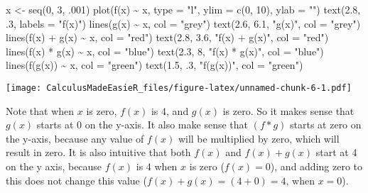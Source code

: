 \documentclass[
]{book}
\newenvironment{Shaded}{\begin{snugshade}}{\end{snugshade}}
\newcommand{\AttributeTok}[1]{\textcolor[rgb]{0.77,0.63,0.00}{#1}}
\newcommand{\DecValTok}[1]{\textcolor[rgb]{0.00,0.00,0.81}{#1}}
\newcommand{\FloatTok}[1]{\textcolor[rgb]{0.00,0.00,0.81}{#1}}
\newcommand{\FunctionTok}[1]{\textcolor[rgb]{0.00,0.00,0.00}{#1}}
\newcommand{\NormalTok}[1]{#1}
\newcommand{\OtherTok}[1]{\textcolor[rgb]{0.56,0.35,0.01}{#1}}
\newcommand{\SpecialCharTok}[1]{\textcolor[rgb]{0.00,0.00,0.00}{#1}}
\newcommand{\StringTok}[1]{\textcolor[rgb]{0.31,0.60,0.02}{#1}}
\begin{document}
\begin{Shaded}
\begin{Highlighting}[]
\NormalTok{x }\OtherTok{\textless{}{-}} \FunctionTok{seq}\NormalTok{(}\DecValTok{0}\NormalTok{, }\DecValTok{3}\NormalTok{, .}\DecValTok{001}\NormalTok{)}
\FunctionTok{plot}\NormalTok{(}\FunctionTok{f}\NormalTok{(x) }\SpecialCharTok{\textasciitilde{}}\NormalTok{ x, }\AttributeTok{type =} \StringTok{"l"}\NormalTok{, }\AttributeTok{ylim =} \FunctionTok{c}\NormalTok{(}\DecValTok{0}\NormalTok{, }\DecValTok{10}\NormalTok{), }\AttributeTok{ylab =} \StringTok{""}\NormalTok{)}
\FunctionTok{text}\NormalTok{(}\FloatTok{2.8}\NormalTok{, .}\DecValTok{3}\NormalTok{, }\AttributeTok{labels =} \StringTok{"f(x)"}\NormalTok{)}
\FunctionTok{lines}\NormalTok{(}\FunctionTok{g}\NormalTok{(x) }\SpecialCharTok{\textasciitilde{}}\NormalTok{ x, }\AttributeTok{col =} \StringTok{"grey"}\NormalTok{)}
\FunctionTok{text}\NormalTok{(}\FloatTok{2.6}\NormalTok{, }\FloatTok{6.1}\NormalTok{, }\StringTok{"g(x)"}\NormalTok{, }\AttributeTok{col =} \StringTok{"grey"}\NormalTok{)}
\FunctionTok{lines}\NormalTok{(}\FunctionTok{f}\NormalTok{(x) }\SpecialCharTok{+} \FunctionTok{g}\NormalTok{(x) }\SpecialCharTok{\textasciitilde{}}\NormalTok{ x, }\AttributeTok{col =} \StringTok{"red"}\NormalTok{)}
\FunctionTok{text}\NormalTok{(}\FloatTok{2.8}\NormalTok{, }\FloatTok{3.6}\NormalTok{, }\StringTok{"f(x) + g(x)"}\NormalTok{, }\AttributeTok{col =} \StringTok{"red"}\NormalTok{)}
\FunctionTok{lines}\NormalTok{(}\FunctionTok{f}\NormalTok{(x) }\SpecialCharTok{*} \FunctionTok{g}\NormalTok{(x) }\SpecialCharTok{\textasciitilde{}}\NormalTok{ x, }\AttributeTok{col =} \StringTok{"blue"}\NormalTok{)}
\FunctionTok{text}\NormalTok{(}\FloatTok{2.3}\NormalTok{, }\DecValTok{8}\NormalTok{, }\StringTok{"f(x) * g(x)"}\NormalTok{, }\AttributeTok{col =} \StringTok{"blue"}\NormalTok{)}
\FunctionTok{lines}\NormalTok{(}\FunctionTok{f}\NormalTok{(}\FunctionTok{g}\NormalTok{(x)) }\SpecialCharTok{\textasciitilde{}}\NormalTok{ x, }\AttributeTok{col =} \StringTok{"green"}\NormalTok{)}
\FunctionTok{text}\NormalTok{(}\FloatTok{1.5}\NormalTok{, .}\DecValTok{3}\NormalTok{, }\StringTok{"f(g(x))"}\NormalTok{, }\AttributeTok{col =} \StringTok{"green"}\NormalTok{)}
\end{Highlighting}
\end{Shaded}

\texttt{[image: CalculusMadeEasieR\_files/figure-latex/unnamed-chunk-6-1.pdf]}

Note that when \(x\) is zero, \(f(x)\) is 4, and \(g(x)\) is zero.
So it makes sense that \(g(x)\) starts at 0 on the y-axis.
It also make sense that \((f * g)\) starts at zero on the y-axis, because any value of \(f(x)\) will be multiplied by zero, which will result in zero.
It is also intuitive that both \(f(x)\) and \(f(x) + g(x)\) start at 4 on the y axis, because \(f(x)\) is 4 when \(x\) is zero (\(f(x) = 0\)), and adding zero to this does not change this value (\(f(x) + g(x) = (4 + 0) = 4\), when \(x=0\)).
\end{document}

